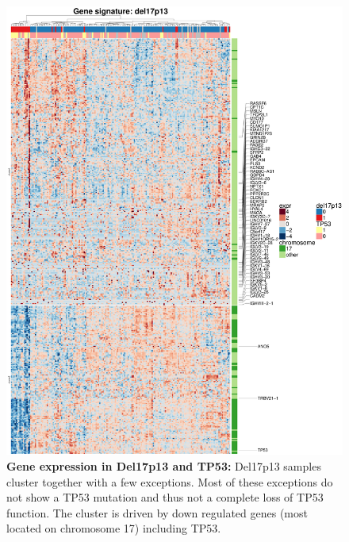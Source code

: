 \begin{figure}
	\centering
	\includegraphics[width=\columnwidth]{./Figures/gene_exprDel17p13_gsea_Kegg.pdf}
	\caption{\textbf{Gene expression in Del17p13 and TP53:} Del17p13 samples cluster together with a few exceptions. Most of these exceptions do not show a TP53 mutation and thus not a complete loss of TP53 function. The cluster is driven by down regulated genes (most located on chromosome 17) including TP53.}
	\label{fig:gene_exprdel17p13_gsea_kegg}
\end{figure}

